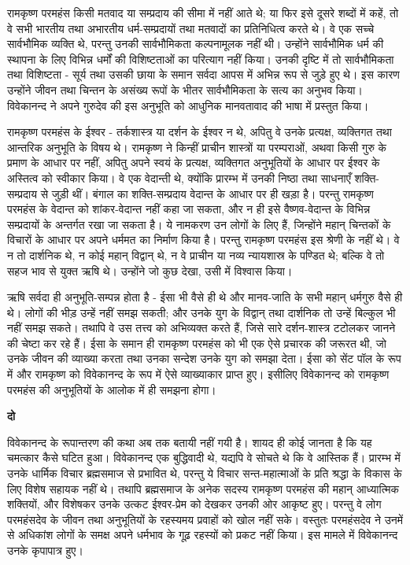 रामकृष्ण परमहंस किसी मतवाद या सम्प्रदाय की सीमा में नहीं आते थे; या फिर इसे दूसरे शब्दों में कहें, तो वे सभी भारतीय तथा अभारतीय धर्म-सम्प्रदायों तथा मतवादों का प्रतिनिधित्व करते थे। वे एक सच्चे सार्वभौमिक व्यक्ति थे, परन्तु उनकी सार्वभौमिकता कल्पनामूलक नहीं थी। उन्होंने सार्वभौमिक धर्म की स्थापना के लिए विभिन्न धर्मों की विशिष्टताओं का परित्याग नहीं किया। उनकी दृष्टि में तो सार्वभौमिकता तथा विशिष्टता - सूर्य तथा उसकी छाया के समान सर्वदा आपस में अभिन्न रूप से जुड़े हुए थे। इस कारण उन्होंने जीवन तथा चिन्तन के असंख्य रूपों के भीतर सार्वभौमिकता के सत्य का अनुभव किया। विवेकानन्द ने अपने गुरुदेव की इस अनुभूति को आधुनिक मानवतावाद की भाषा में प्रस्तुत किया। 

\newpage

रामकृष्ण परमहंस के ईश्वर - तर्कशास्त्र या दर्शन के ईश्वर न थे, अपितु वे उनके प्रत्यक्ष, व्यक्तिगत तथा आन्तरिक अनुभूति के विषय थे। रामकृष्ण ने किन्हीं प्राचीन शास्त्रों या परम्पराओं, अथवा किसी गुरु के प्रमाण के आधार पर नहीं, अपितु अपने स्वयं के प्रत्यक्ष, व्यक्तिगत अनुभूतियों के आधार पर ईश्वर के अस्तित्व को स्वीकार किया। वे एक वेदान्ती थे, क्योंकि प्रारम्भ में उनकी निष्ठा तथा साधनाएँ शक्ति-सम्प्रदाय से जुड़ी थीं। बंगाल का शक्ति-सम्प्रदाय वेदान्त के आधार पर ही खड़ा है। परन्तु रामकृष्ण परमहंस के वेदान्त को शांकर-वेदान्त नहीं कहा जा सकता, और न ही इसे वैष्णव-वेदान्त के विभिन्न सम्प्रदायों के अन्तर्गत रखा जा सकता है। ये नामकरण उन लोगों के लिए हैं, जिन्होंने महान् चिन्तकों के विचारों के आधार पर अपने धर्ममत का निर्माण किया है। परन्तु रामकृष्ण परमहंस इस श्रेणी के नहीं थे। वे न तो दार्शनिक थे, न कोई महान् विद्वान् थे, न वे प्राचीन या नव्य न्यायशास्र के पण्डित थे; बल्कि वे तो सहज भाव से युक्त ऋषि थे। उन्होंने जो कुछ देखा, उसी में विश्वास किया। 

ऋषि सर्वदा ही अनुभूति-सम्पन्न होता है - ईसा भी वैसे ही थे और मानव-जाति के सभी महान् धर्मगुरु वैसे ही थे। लोगों की भीड़ उन्हें नहीं समझ सकती; और उनके युग के विद्वान् तथा दार्शनिक तो उन्हें बिल्कुल भी नहीं समझ सकते। तथापि वे उस तत्त्व को अभिव्यक्त करते हैं, जिसे सारे दर्शन-शास्त्र टटोलकर जानने की चेष्टा कर रहे हैं। ईसा के समान ही रामकृष्ण परमहंस को भी एक ऐसे प्रचारक की जरूरत थी, जो उनके जीवन की व्याख्या करता तथा उनका सन्देश उनके युग को समझा देता। ईसा को सेंट पॉल के रूप में और रामकृष्ण को विवेकानन्द के रूप में ऐसे व्याख्याकार प्राप्त हुए। इसीलिए विवेकानन्द को रामकृष्ण परमहंस की अनुभूतियों के आलोक में ही समझना होगा। 

\centerline{\textbf{दो }}

विवेकानन्द के रूपान्तरण की कथा अब तक बतायी नहीं गयी है। शायद ही कोई जानता है कि यह चमत्कार कैसे घटित हुआ। विवेकानन्द एक बुद्धिवादी थे, यद्यपि वे सोचते थे कि वे आस्तिक हैं। प्रारम्भ में उनके धार्मिक विचार ब्रह्मसमाज से प्रभावित थे, परन्तु ये विचार सन्त-महात्माओं के प्रति श्रद्धा के विकास के लिए विशेष सहायक नहीं थे। तथापि ब्रह्मसमाज के अनेक सदस्य रामकृष्ण परमहंस की महान् आध्यात्मिक शक्तियों, और विशेषकर उनके उत्कट ईश्वर-प्रेम को देखकर उनकी ओर आकृष्ट हुए। परन्तु वे लोग परमहंसदेव के जीवन तथा अनुभूतियों के रहस्यमय प्रवाहों को खोल नहीं सके। वस्तुतः परमहंसदेव ने उनमें से अधिकांश लोगों के समक्ष अपने धर्मभाव के गूढ़ रहस्यों को प्रकट नहीं किया। इस मामले में विवेकानन्द उनके कृपापात्र हुए। 

